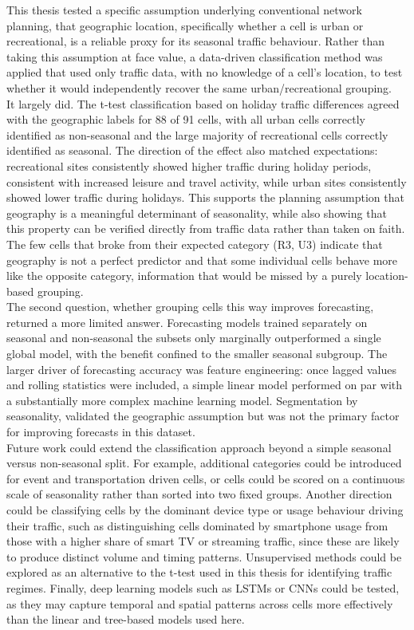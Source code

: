 This thesis tested a specific assumption underlying conventional network planning,  that geographic location, specifically whether a cell is urban or recreational, is a reliable proxy for its seasonal traffic behaviour. Rather than taking this assumption at face value, a data-driven classification method was applied that used only traffic data, with no knowledge of a cell's location, to test whether it would independently recover the same urban/recreational grouping. \\

It largely did. The t-test classification based on holiday traffic differences agreed with the geographic labels for 88 of 91 cells, with all urban cells correctly identified as non-seasonal and the large majority of recreational cells correctly identified as seasonal. The direction of the effect also matched expectations: recreational sites consistently showed higher traffic during holiday periods, consistent with increased leisure and travel activity, while urban sites consistently showed lower traffic during holidays. This supports the planning assumption that geography is a meaningful determinant of seasonality, while also showing that this property can be verified directly from traffic data rather than taken on faith. The few cells that broke from their expected category (R3, U3) indicate that geography is not a perfect predictor and that some individual cells behave more like the opposite category, information that would be missed by a purely location-based grouping. \\

The second question, whether grouping cells this way improves forecasting, returned a more limited answer. Forecasting models trained separately on seasonal and non-seasonal the subsets only marginally outperformed a single global model, with the benefit confined to the smaller seasonal subgroup. The larger driver of forecasting accuracy was feature engineering: once lagged values and rolling statistics were included, a simple linear model performed on par with a substantially more complex machine learning model. Segmentation by seasonality, validated the geographic assumption but was not the primary factor for improving forecasts in this dataset. \\

Future work could extend the classification approach beyond a simple seasonal versus non-seasonal split. For example, additional categories could be introduced for event and transportation driven cells, or cells could be scored on a continuous scale of seasonality rather than sorted into two fixed groups. Another direction could be classifying cells by the dominant device type or usage behaviour driving their traffic, such as distinguishing cells dominated by smartphone usage from those with a higher share of smart TV or streaming traffic, since these are likely to produce distinct volume and timing patterns. Unsupervised methods could be explored as an alternative to the t-test used in this thesis for identifying traffic regimes. Finally, deep learning models such as LSTMs or CNNs could be tested, as they may capture temporal and spatial patterns across cells more effectively than the linear and tree-based models used here. \\